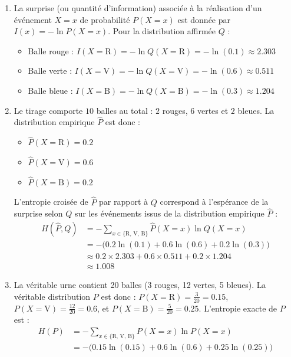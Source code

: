 \documentclass[solutions]{../exercices}
\begin{document}
\begin{solution}
\begin{enumerate}
    \item La surprise (ou quantité d'information) associée à la réalisation d'un événement $X=x$ de probabilité $P(X=x)$ est donnée par $I(x) = -\ln P(X=x)$.
    Pour la distribution affirmée $Q$ :
    \begin{itemize}
        \item Balle rouge : $I(X=\text{R}) = -\ln Q(X=\text{R}) = -\ln(0.1) \approx 2.303$
        \item Balle verte : $I(X=\text{V}) = -\ln Q(X=\text{V}) = -\ln(0.6) \approx 0.511$
        \item Balle bleue : $I(X=\text{B}) = -\ln Q(X=\text{B}) = -\ln(0.3) \approx 1.204$
    \end{itemize}
    \item Le tirage comporte $10$ balles au total : $2$ rouges, $6$ vertes et $2$ bleues.
    La distribution empirique $\hat{P}$ est donc :
    \begin{itemize}
        \item $\hat{P}(X=\text{R}) = 0.2$
        \item $\hat{P}(X=\text{V}) = 0.6$
        \item $\hat{P}(X=\text{B}) = 0.2$
    \end{itemize}
    L'entropie croisée de $\hat{P}$ par rapport à $Q$ correspond à l'espérance de la surprise selon $Q$ sur les événements issus de la distribution empirique $\hat{P}$ :
    \begin{align*}
        H(\hat{P}, Q) &= - \sum_{x \in \{\text{R, V, B}\}} \hat{P}(X=x) \ln Q(X=x) \\
        &= -\big(0.2 \ln(0.1) + 0.6 \ln(0.6) + 0.2 \ln(0.3)\big) \\
        &\approx 0.2 \times 2.303 + 0.6 \times 0.511 + 0.2 \times 1.204 \\
        &\approx 1.008
    \end{align*}
    \item La véritable urne contient 20 balles (3 rouges, 12 vertes, 5 bleues). La véritable distribution $P$ est donc :
    $P(X=\text{R}) = \frac{3}{20} = 0.15$, $P(X=\text{V}) = \frac{12}{20} = 0.6$, et $P(X=\text{B}) = \frac{5}{20} = 0.25$.
    L'entropie exacte de $P$ est :
    \begin{align*}
        H(P) &= - \sum_{x \in \{\text{R, V, B}\}} P(X=x) \ln P(X=x) \\
        &= -\big(0.15 \ln(0.15) + 0.6 \ln(0.6) + 0.25 \ln(0.25)\big) \\

\end{align*}
\end{enumerate}
\end{solution}
\end{document}
